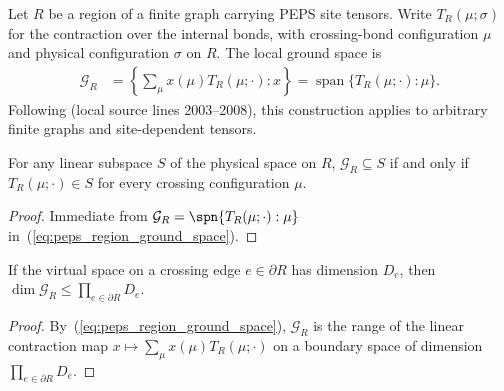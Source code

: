 \begin{definition}%
    \label{def:peps_region_ground_space}
    \leanok
    Let $R$ be a region of a finite graph carrying PEPS site tensors.
    Write $T_R(\mu;\sigma)$ for the contraction over the internal bonds,
    with crossing-bond configuration $\mu$ and physical configuration
    $\sigma$ on $R$. The local ground space is
    \begin{align}
        \mathcal G_R
         & =\left\{\sum_{\mu}x(\mu)T_R(\mu;\cdot):x\right\}
        =\operatorname{span}\{T_R(\mu;\cdot):\mu\}.
        \label{eq:peps_region_ground_space}
    \end{align}
    Following \cite[Section~IV.C.1]{Cirac2021Matrix} (local source
    lines 2003--2008), this construction applies to arbitrary finite graphs
    and site-dependent tensors.
\end{definition}

\begin{lemma}%
    \label{lem:peps_region_ground_space_le}
    \leanok
    For any linear subspace $S$ of the physical space on $R$,
    $\mathcal G_R\subseteq S$ if and only if $T_R(\mu;\cdot)\in S$ for every
    crossing configuration $\mu$.
\end{lemma}

\begin{proof}\leanok
    Immediate from $\mathcal G_R=\spn\{T_R(\mu;\cdot):\mu\}$ in~(\ref{eq:peps_region_ground_space}).
\end{proof}

\begin{lemma}%
    \label{thm:peps_region_ground_space_dimension}
    \leanok
    If the virtual space on a crossing edge $e\in\partial R$ has dimension
    $D_e$, then $\dim\mathcal G_R\leq\prod_{e\in\partial R}D_e$.
\end{lemma}

\begin{proof}\leanok
    By~(\ref{eq:peps_region_ground_space}), $\mathcal G_R$ is the range of the
    linear contraction map $x\mapsto\sum_\mu x(\mu)T_R(\mu;\cdot)$ on a
    boundary space of dimension $\prod_{e\in\partial R}D_e$.
\end{proof}

